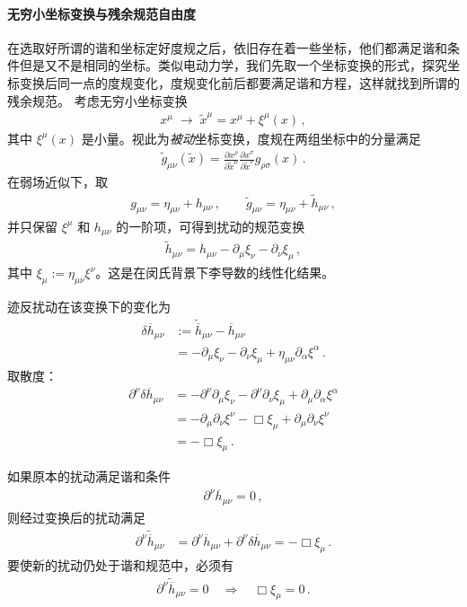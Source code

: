 \paragraph{无穷小坐标变换与残余规范自由度}
在选取好所谓的谐和坐标定好度规之后，依旧存在着一些坐标，他们都满足谐和条件但是又不是相同的坐标。类似电动力学，我们先取一个坐标变换的形式，探究坐标变换后同一点的度规变化，度规变化前后都要满足谐和方程，这样就找到所谓的残余规范。
考虑无穷小坐标变换
\begin{align}
x^{\mu}
\;\longrightarrow\;
\widetilde{x}^{\mu}
=
x^{\mu}
+
\xi^{\mu}(x)\,,
\end{align}
其中 $\xi^{\mu}(x)$ 是小量。视此为\emph{被动}坐标变换，度规在两组坐标中的分量满足
\begin{align}
\widetilde{g}_{\mu\nu}(\widetilde{x})
=
\frac{\partial x^{\rho}}{\partial \widetilde{x}^{\mu}}
\frac{\partial x^{\sigma}}{\partial \widetilde{x}^{\nu}}
g_{\rho\sigma}(x)\,.
\end{align}
在弱场近似下，取
\begin{align}
g_{\mu\nu} = \eta_{\mu\nu} + h_{\mu\nu}\,,\qquad
\widetilde{g}_{\mu\nu} = \eta_{\mu\nu} + \widetilde{h}_{\mu\nu}\,,
\end{align}
并只保留 $\xi^{\mu}$ 和 $h_{\mu\nu}$ 的一阶项，可得到扰动的规范变换
\begin{align}
\widetilde{h}_{\mu\nu}
=
h_{\mu\nu}
-
\partial_{\mu}\xi_{\nu}
-
\partial_{\nu}\xi_{\mu}\,,
\end{align}
其中 $\xi_{\mu} := \eta_{\mu\nu}\xi^{\nu}$。这是在闵氏背景下李导数的线性化结果。

迹反扰动在该变换下的变化为
\begin{align}
\delta\overline{h}_{\mu\nu}
&:=
\widetilde{\overline{h}}_{\mu\nu}-\overline{h}_{\mu\nu}
\\[0.3em]
&=
-\partial_{\mu}\xi_{\nu}
-\partial_{\nu}\xi_{\mu}
+
\eta_{\mu\nu}\partial_{\alpha}\xi^{\alpha}\,.
\end{align}
取散度：
\begin{align}
\partial^{\nu}\delta\overline{h}_{\mu\nu}
&=
-\partial^{\nu}\partial_{\mu}\xi_{\nu}
-\partial^{\nu}\partial_{\nu}\xi_{\mu}
+
\partial_{\mu}\partial_{\alpha}\xi^{\alpha}
\\[0.3em]
&=
-\partial_{\mu}\partial_{\nu}\xi^{\nu}
-\Box\xi_{\mu}
+
\partial_{\mu}\partial_{\nu}\xi^{\nu}
\\[0.3em]
&=
-\Box\xi_{\mu}\,.
\end{align}

如果原本的扰动满足谐和条件
\begin{align}
\partial^{\nu}\overline{h}_{\mu\nu} = 0\,,
\end{align}
则经过变换后的扰动满足
\begin{align}
\partial^{\nu}\widetilde{\overline{h}}_{\mu\nu}
&=
\partial^{\nu}\overline{h}_{\mu\nu}
+
\partial^{\nu}\delta\overline{h}_{\mu\nu}
=
-\Box\xi_{\mu}\,.
\end{align}
要使新的扰动仍处于谐和规范中，必须有
\begin{align}
\partial^{\nu}\widetilde{\overline{h}}_{\mu\nu} = 0
\quad\Longrightarrow\quad
\Box\xi_{\mu} = 0\,.
\end{align}

